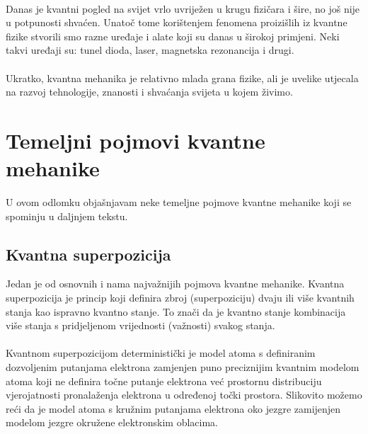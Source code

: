 \documentclass[times, utf8, zavrsni, numeric]{fer}
\begin{document}
\paragraph{}
Danas je kvantni pogled na svijet vrlo uvriježen u krugu fizičara i šire, no još nije u potpunosti shvaćen. Unatoč tome korištenjem fenomena proizišlih iz kvantne fizike stvorili smo razne uređaje i alate koji su danas u širokoj primjeni. Neki takvi uređaji su: tunel dioda, laser, magnetska rezonancija i drugi.

\paragraph{}
Ukratko, kvantna mehanika je relativno mlada grana fizike, ali je uvelike utjecala na razvoj tehnologije, znanosti i shvaćanja svijeta u kojem živimo.

\section{Temeljni pojmovi kvantne mehanike}
U ovom odlomku objašnjavam neke temeljne pojmove kvantne mehanike koji se spominju u daljnjem tekstu. 

\subsection{Kvantna superpozicija}
Jedan je od osnovnih i nama najvažnijih pojmova kvantne mehanike.
Kvantna superpozicija je princip koji definira zbroj (superpoziciju) dvaju ili više kvantnih stanja kao ispravno kvantno stanje. 
To znači da je kvantno stanje kombinacija više stanja s pridjeljenom vrijednosti (važnosti) svakog stanja.

\paragraph{}
Kvantnom superpozicijom deterministički je model atoma s definiranim dozvoljenim putanjama elektrona zamjenjen puno preciznijim kvantnim modelom atoma koji ne definira točne putanje elektrona već prostornu distribuciju vjerojatnosti pronalaženja elektrona u određenoj točki prostora. Slikovito možemo reći da je model atoma s kružnim putanjama elektrona oko jezgre zamijenjen modelom jezgre okružene elektronskim oblacima. \citep{bozja_cestica}
\end{document}
